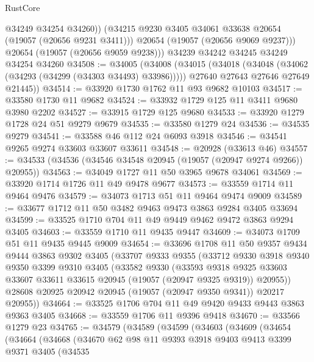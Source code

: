 \begin{lexlean}{RustCore}
\begin{coremodule}
            @34249
            @34254
            @34260))
        (@34215 @9230 @3405 @34061 @33638 @20654 (@19057 (@20656 @9231 @3411)))
        @20654
        (@19057 (@20656 @9069 @9237)))
      @20654
      (@19057 (@20656 @9059 @9238)))
    @34239
    @34242
    @34245
    @34249
    @34254
    @34260
@34508 := @34005
    (@34008
      (@34015
        (@34018 (@34048 (@34062 (@34293 (@34299 (@34303 @34493) @33986)))))
        @27640
        @27643
        @27646
        @27649
        @21445))
@34514 := @33920 @1730 @1762 @11 @93 @9682 @10103
@34517 := @33580 @1730 @11 @9682
@34524 := @33932 @1729 @125 @11 @3411 @9680 @3980 @2202
@34527 := @33915 @1729 @125 @9680
@34533 := @33920 @1279 @1728 @24 @51 @9279 @9679
@34535 := @33580 @1279 @24
@34536 := @34535 @9279
@34541 := @33588 @46 @112 @24 @6093 @3918
@34546 := @34541 @9265 @9274 @33603 @33607 @33611
@34548 := @20928 (@33613 @46)
@34557 := @34533 (@34536 (@34546 @34548 @20945 (@19057 (@20947 @9274 @9266)) @20955))
@34563 := @34049 @1727 @11 @50 @3965 @9678 @34061
@34569 := @33920 @1714 @1726 @11 @49 @9478 @9677
@34573 := @33559 @1714 @11 @9464 @9476
@34579 := @34073 @1713 @51 @11 @9464 @9474 @9009
@34589 := @33677 @1712 @11 @50 @3482 @9463 @9473 @3863 @9284 @3405 @33694
@34599 := @33525 @1710 @704 @11 @49 @9449 @9462 @9472 @3863 @9294 @3405
@34603 := @33559 @1710 @11 @9435 @9447
@34609 := @34073 @1709 @51 @11 @9435 @9445 @9009
@34654 := @33696
    @1708
    @11
    @50
    @9357
    @9434
    @9444
    @3863
    @9302
    @3405
    (@33707
      @9333
      @9355
      (@33712
        @9330
        @3918
        @9340
        @9350
        @3399
        @9310
        @3405
        (@33582
          @9330
          (@33593
            @9318
            @9325
            @33603
            @33607
            @33611
            @33615
            @20945
            (@19057 (@20947 @9325 @9319))
            @20955))
        @28608
        @20925
        @20942
        @20945
        (@19057 (@20947 @9350 @9341))
        @20217
        @20955))
@34664 := @33525 @1706 @704 @11 @49 @9420 @9433 @9443 @3863 @9363 @3405
@34668 := @33559 @1706 @11 @9396 @9418
@34670 := @33566 @1279 @23
@34765 := @34579
    (@34589
      (@34599
        (@34603
          (@34609
            (@34654
              (@34664
                (@34668
                  (@34670
                    @62
                    @98
                    @11
                    @9393
                    @3918
                    @9403
                    @9413
                    @3399
                    @9371
                    @3405
                    (@34535

\end{coremodule}
\end{lexlean}
